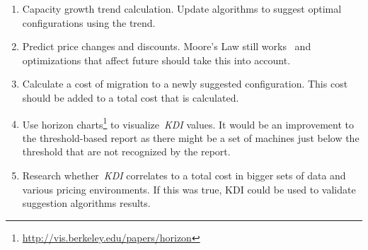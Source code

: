 \documentclass[]{final_report}
\begin{document}
\begin{enumerate}
\item Capacity growth trend calculation. Update algorithms to suggest optimal configurations using the trend. 
\item Predict price changes and discounts. Moore's Law still works~\cite{7057609} and optimizations that affect future should take this into account.
\item Calculate a cost of migration to a newly suggested configuration. This cost should be added to a total cost that is calculated.
\item Use horizon charts\footnote{\url{http://vis.berkeley.edu/papers/horizon}} to visualize~\textit{KDI} values. It would be an improvement to the threshold-based report as there might be a set of machines just below the threshold that are not recognized by the report.
\item Research whether~\textit{KDI} correlates to a total cost in bigger sets of data and various pricing environments. If this was true, KDI could be used to validate suggestion algorithms results. 



\end{enumerate}


\newpage

\label{endpage}
{}

\end{document}
